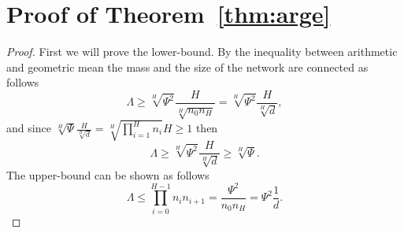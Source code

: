 \documentclass[twoside]{article}
\begin{document}



\clearpage

\toptitlebar 
{\Large \bf  {} \par}
\bottomtitlebar

\section{Proof of Theorem~\ref{thm:arge}}
\begin{proof}
First we will prove the lower-bound. By the inequality between arithmetic and geometric mean the mass and the size of the network are connected as follows
\[\Lambda \geq \sqrt[H]{\Psi^2}\frac{H}{\sqrt[H]{n_0n_H}} = \sqrt[H]{\Psi^2}\frac{H}{\sqrt[H]{d}},
\]
and since $\sqrt[H]{\Psi}\frac{H}{\sqrt[H]{d}} = \sqrt[H]{\prod_{i = 1}^{H}n_i}H \geq 1$ then 
\[\Lambda \geq \sqrt[H]{\Psi^2}\frac{H}{\sqrt[H]{d}} \geq \sqrt[H]{\Psi}.
\]
The upper-bound can be shown as follows
\[\Lambda \leq \prod_{i=0}^{H-1}n_in_{i+1} = \frac{\Psi^2}{n_0n_H} = \Psi^2\frac{1}{d}.
\]
\end{proof}
\end{document}
